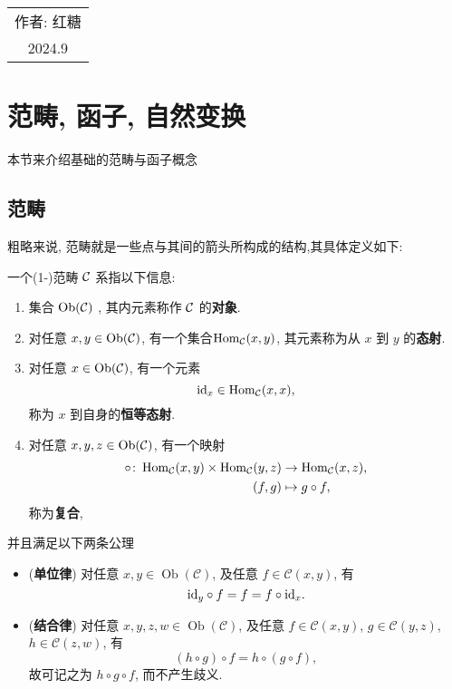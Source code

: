 \begin{flushright}\begin{minipage}{0.3 \textwidth}
	\begin{tabular}{c}
		{作者: \kaishu 红糖} \\
		2024.9  
	\end{tabular}
\end{minipage}\end{flushright}
\section{范畴, 函子, 自然变换}

本节来介绍基础的范畴与函子概念
\subsection{范畴}
粗略来说, 范畴就是一些点与其间的箭头所构成的结构,其具体定义如下:
\begin{definition}[(1-)范畴]\label{定义:1-范畴}
    一个(1-)范畴 $\cal{C}$ 系指以下信息:
    \begin{enumerate}
        \item 集合 $\operatorname{Ob}(\cal{C})$ , 其内元素称作 $\cal{C}$ 的\textbf{对象}.
        \item 对任意 $x, y \in \operatorname{Ob} (\mathcal{C})$, 有一个集合$\operatorname{Hom}_{\mathcal{C}} (x, y)$, 其元素称为从 $x$ 到 $y$ 的\textbf{态射}.
        \item 对任意 $x \in \operatorname{Ob} (\mathcal{C})$,
            有一个元素
            \[
                \mathrm{id}_x \in \operatorname{Hom}_{\mathcal{C}} (x, x),
            \]
            称为 $x$ 到自身的\textbf{恒等态射}.
        \item 对任意 $x, y, z \in \operatorname{Ob} (\mathcal{C})$,
            有一个映射
            \begin{align*}
                \circ \colon
                \operatorname{Hom}_{\mathcal{C}} (x, y) \times \operatorname{Hom}_{\mathcal{C}} (y, z)
                & \to \operatorname{Hom}_{\mathcal{C}} (x, z), \\
                (f, g) & \mapsto g \circ f,
            \end{align*}
            称为\textbf{复合},
    \end{enumerate}
    并且满足以下两条公理
     \begin{itemize}
        \item
            (\textbf{单位律})
            对任意 $x, y \in \operatorname{Ob} (\mathcal{C})$,
            及任意 $f \in \mathcal{C} (x, y)$, 有
            \[
                \mathrm{id}_y \circ f = f = f \circ \mathrm{id}_x.
            \]
        \item
            (\textbf{结合律})
            对任意 $x, y, z, w \in \operatorname{Ob} (\mathcal{C})$,
            及任意 $f \in \mathcal{C} (x, y)$,
            $g \in \mathcal{C} (y, z)$, 
            $h \in \mathcal{C} (z, w)$, 有
            \[
                (h \circ g) \circ f = h \circ (g \circ f),
            \]
            故可记之为 $h \circ g \circ f$, 而不产生歧义.
    \end{itemize}
\end{definition}
